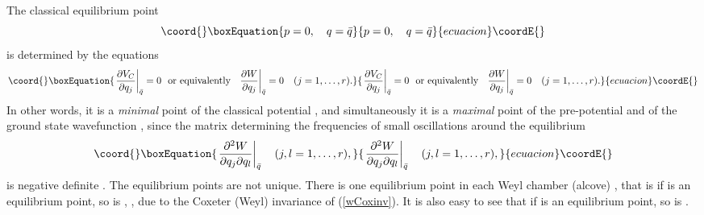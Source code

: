 \documentclass[a4paper,12pt]{article}
\begin{document}
The classical equilibrium point
\begin{equation}\coord{}\boxEquation{
   p=0,\quad q=\bar{q}
   \label{clasequil}
}{
   p=0,\quad q=\bar{q}
   }{ecuacion}\coordE{}\end{equation}
is determined by the equations \cite{cs}
\begin{equation}\coord{}\boxEquation{
   \left.{\partial V_C\over{\partial q_j}}\right|_{\bar{q}}=0
   \mbox{~~or equivalently~~}
   \left.{\partial W\over{\partial q_j}}\right|_{\bar{q}}=0\quad(j=1,\ldots,r).
   \label{Wmax}
}{
   \left.{\partial V_C\over{\partial q_j}}\right|_{\bar{q}}=0
   \mbox{~~or equivalently~~}
   \left.{\partial W\over{\partial q_j}}\right|_{\bar{q}}=0\quad(j=1,\ldots,r).
   }{ecuacion}\coordE{}\end{equation}
In other words, it is a {\em minimal\/} point of the classical
potential \coordHE{}, and simultaneously it is a {\em maximal\/} point of
the pre-potential \coordHE{} and of the ground state  wavefunction \coordHE{},
since the matrix determining the frequencies of small oscillations around
the equilibrium
\begin{equation}\coord{}\boxEquation{
   \left.{\partial^2 W\over{\partial q_j \partial q_l}}\right|_{\bar{q}}
   \quad (j,l=1,\ldots, r),
   \label{wpp}
}{
   \left.{\partial^2 W\over{\partial q_j \partial q_l}}\right|_{\bar{q}}
   \quad (j,l=1,\ldots, r),
   }{ecuacion}\coordE{}\end{equation}
is negative definite \cite{cs}.
The equilibrium points are not unique.
There is one equilibrium point in each Weyl chamber (alcove) \cite{cs},
that is if \coordHE{} is an equilibrium point, so is \coordHE{},
\myHighlight{$\forall\rho\in\Delta$}\coordHE{}, due to the Coxeter (Weyl) invariance of \coordHE{}
(\ref{wCoxinv}). It is also easy to see that if \coordHE{} is an
equilibrium point, so is \coordHE{}.
\end{document}
